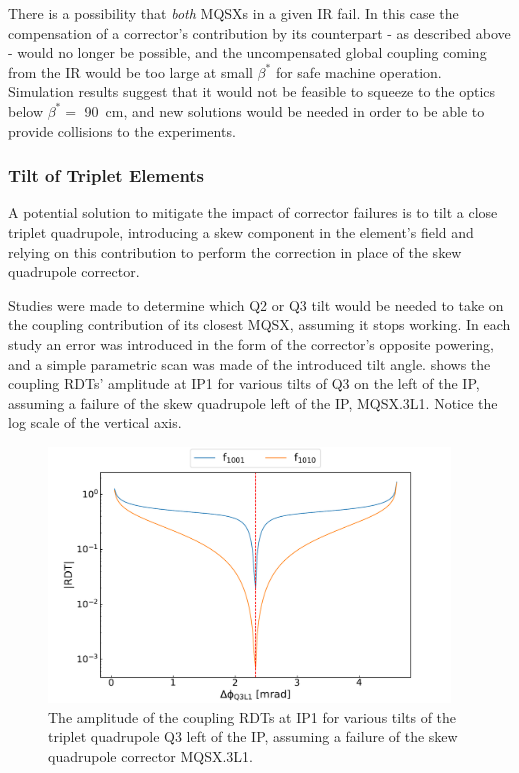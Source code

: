 There is a possibility that \textit{both} MQSXs in a given IR fail.
In this case the compensation of a corrector's contribution by its counterpart - as described above - would no longer be possible, and the uncompensated global coupling coming from the IR would be too large at small \(\beta^{\ast}\) for safe machine operation.
Simulation results suggest that it would not be feasible to squeeze to the optics below \(\beta^{\ast} =\) \qty{90}{\centi\meter}, and new solutions would be needed in order to be able to provide collisions to the experiments.

\subsubsection*{Tilt of Triplet Elements}

A potential solution to mitigate the impact of corrector failures is to tilt a close triplet quadrupole, introducing a skew component in the element's field and relying on this contribution to perform the correction in place of the skew quadrupole corrector.

Studies were made to determine which Q\num{2} or Q\num{3} tilt would be needed to take on the coupling contribution of its closest MQSX, assuming it stops working.
In each study an error was introduced in the form of the corrector's opposite powering, and a simple parametric scan was made of the introduced tilt angle.
 shows the coupling RDTs' amplitude at IP\num{1} for various tilts of Q\num{3} on the left of the IP, assuming a failure of the skew quadrupole left of the IP, MQSX.\num{3}L\num{1}.
Notice the log scale of the vertical axis.

\begin{figure}[!htb]
    \centering
    \includegraphics*[width=0.95\textwidth]{Figures/IR_Coupling_Correction/ir1_compensate_left_with_q3.pdf}
    \caption{The amplitude of the coupling RDTs at IP\num{1} for various tilts of the triplet quadrupole Q\num{3} left of the IP, assuming a failure of the skew quadrupole corrector MQSX.\num{3}L\num{1}.}
    \label{figure:ir1_compensate_left_with_q3}
\end{figure}

